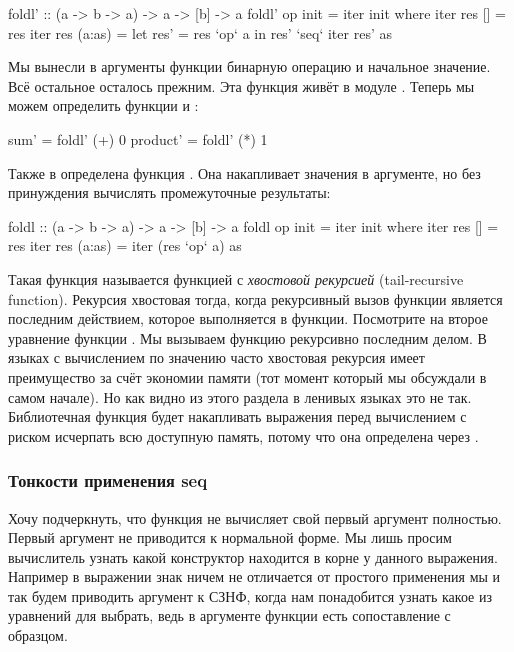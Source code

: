 \begin{code}
foldl' :: (a -> b -> a) -> a -> [b] -> a
foldl' op init = iter init
    where iter res []        = res
          iter res (a:as)    = let res' = res `op` a
                               in  res' `seq` iter res' as 
\end{code}

Мы вынесли в аргументы функции бинарную операцию и 
начальное значение. Всё остальное осталось прежним.
Эта функция живёт в модуле . Теперь
мы можем определить функции  и :

\begin{code}
sum'        = foldl' (+) 0
product'    = foldl' (*) 1
\end{code}


Также в  определена функция . 
Она накапливает значения в аргументе, но без принуждения вычислять 
промежуточные результаты:

\begin{code}
foldl :: (a -> b -> a) -> a -> [b] -> a
foldl op init = iter init
    where iter res []        = res
          iter res (a:as)    = iter (res `op` a) as 
\end{code}

Такая функция называется функцией с \emph{хвостовой рекурсией}
(tail-recursive function). Рекурсия хвостовая тогда, когда 
рекурсивный вызов функции является последним действием, которое 
выполняется в функции. Посмотрите на второе уравнение функции
. Мы вызываем функцию  рекурсивно последним
делом. В языках с вычислением по значению часто хвостовая рекурсия
имеет преимущество за счёт экономии памяти (тот момент который
мы обсуждали в самом начале). Но как видно из этого раздела
в ленивых языках это не так. Библиотечная функция 
будет накапливать выражения перед вычислением с риском
исчерпать всю доступную память, потому что она
определена через .

\subsubsection{Тонкости применения seq}

Хочу подчеркнуть, что функция  не вычисляет 
свой первый аргумент полностью. Первый аргумент не приводится
к нормальной форме. Мы лишь просим вычислитель узнать какой 
конструктор находится в корне у данного выражения.
Например в выражении  знак
\In{$!} ничем не отличается от простого применения мы
и так будем приводить аргумент  к СЗНФ,
когда нам понадобится узнать какое из уравнений для 
 выбрать, ведь в аргументе функции 
есть сопоставление с образцом.

